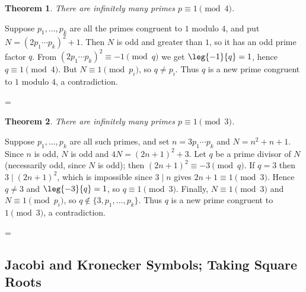 \documentclass[11pt]{article}
\makeatletter
\theoremstyle{ntstyle}
\newtheorem{theorem}{Theorem}[subsection]
\let\nt@closedisplay\]
\def\nt@guardedclose{\@ifnextchar\par{\nt@closeafterpar}{\@ifnextchar\end{\postdisplaypenalty\@M\nt@closedisplay}{\nt@closedisplay}}}
\def\nt@closeafterpar\par{\@ifnextchar\par{\nt@closeafterpar}{\@ifnextchar\end{\postdisplaypenalty\@M\nt@closedisplay\par}{\nt@closedisplay\par}}}
\renewenvironment{proof}[1][\proofname]{\par
  \pushQED{\qed}\normalfont\topsep\medskipamount\edef\nt@afterproof{\@endparpenalty=\the\@endparpenalty\relax}\@beginparpenalty\@M\@endparpenalty\@M\let\]\nt@guardedclose\trivlist\item[]\textit{#1\@addpunct{.}} \ignorespaces}{\ifvmode\addpenalty\@M\fi\popQED\nt@afterproof\endtrivlist\@endpefalse}
\makeatother
\begin{document}
\begin{theorem}\label{thm:7.5.3} There are infinitely many primes $p \equiv 1 \pmod{4}$.

\end{theorem}

\begin{proof} Suppose $p_1, \ldots, p_k$ are all the primes congruent to $1$ modulo $4$,
	and put $N = (2 p_1 \cdots p_k)^2 + 1$. Then $N$ is odd and greater than $1$, so
	it has an odd prime factor $q$. From $(2p_1\cdots p_k)^2 \equiv -1
		\pmod{q}$ we get $\leg{-1}{q} = 1$, hence $q \equiv 1
		\pmod{4}$. But $N \equiv 1 \pmod{p_i}$, so $q \neq p_i$. Thus $q$ is a new prime
	congruent to $1$ modulo $4$, a contradiction.

\end{proof}

\begin{theorem}\label{thm:7.5.4} There are infinitely many primes $p \equiv 1 \pmod{3}$.

\end{theorem}

\begin{proof} Suppose $p_1, \ldots, p_k$ are all such
	primes, and set $n = 3 p_1 \cdots p_k$ and $N = n^2 + n + 1$. Since $n$
	is odd, $N$ is odd and $4N = (2n+1)^2 + 3$. Let $q$ be a prime divisor of $N$ (necessarily odd, since $N$ is odd); then
	$(2n+1)^2 \equiv -3 \pmod{q}$. If $q = 3$ then $3 \mid (2n+1)^2$,
	which is impossible since $3 \mid n$ gives $2n+1 \equiv 1 \pmod{3}$. Hence $q
		\neq 3$ and $\leg{-3}{q} = 1$, so $q \equiv 1 \pmod{3}$. Finally, $N \equiv 1 \pmod{3}$ and $N \equiv 1 \pmod{p_i}$, so $q
		\notin \{3, p_1, \ldots, p_k\}$. Thus $q$ is a new prime congruent to $1 \pmod{3}$,
	a contradiction.

\end{proof}

\subsection{Jacobi and Kronecker Symbols; Taking Square Roots}
\end{document}

